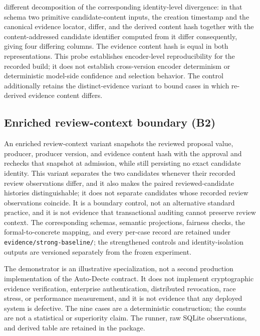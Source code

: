 \documentclass[preprint,12pt,authoryear]{elsarticle}
\newcommand{\code}[1]{\nolinkurl{#1}}
\begin{document}
different decomposition of the corresponding identity-level divergence: in that schema two primitive
candidate-content inputs, the creation timestamp and the canonical evidence locator, differ, and the
derived content hash together with the content-addressed candidate identifier computed from it differ
consequently, giving four differing columns. The evidence content hash is equal in both
representations. This probe
establishes encoder-level reproducibility for the recorded build; it does not
establish cross-version encoder determinism or deterministic model-side
confidence and selection behavior. The control additionally retains the
distinct-evidence variant to bound cases in which re-derived evidence content
differs.

\subsection{Enriched review-context boundary (B2)}
\label{app:review-context-boundary}

An enriched review-context variant snapshots the reviewed proposal value,
producer, producer version, and evidence content hash with the approval and
rechecks that snapshot at admission, while still persisting no exact candidate
identity. This variant separates the two candidates whenever their recorded
review observations differ, and it also makes the paired reviewed-candidate
histories distinguishable; it does not separate candidates whose recorded review
observations coincide. It is a boundary control, not an alternative standard
practice, and it is not evidence that transactional auditing cannot preserve
review context. The corresponding schemas, semantic projections, fairness checks,
the formal-to-concrete mapping, and every per-case record are retained under
\code{evidence/strong-baseline/}; the strengthened controls and identity-isolation
outputs are versioned separately from the frozen experiment.

The demonstrator is an illustrative specialization, not a second production
implementation of the Auto-Decte contract. It does not implement cryptographic
evidence verification, enterprise authentication, distributed revocation, race
stress, or performance measurement, and it is not evidence that any deployed
system is defective. The nine cases are a deterministic construction; the
counts are not a statistical or superiority claim. The runner, raw SQLite
observations, and derived table are retained in the package.
\end{document}
